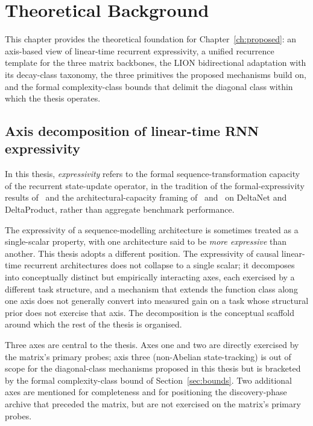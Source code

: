 \chapter{Theoretical Background}\label{ch:theoretical}

This chapter provides the theoretical foundation for
Chapter~\ref{ch:proposed}: an axis-based view of linear-time
recurrent expressivity, a unified recurrence template for the
three matrix backbones, the LION bidirectional adaptation with
its decay-class taxonomy, the three primitives the proposed
mechanisms build on, and the formal complexity-class bounds that
delimit the diagonal class within which the thesis operates.

\section{Axis decomposition of linear-time RNN expressivity}\label{sec:axes}

In this thesis, \textit{expressivity} refers to the formal
sequence-transformation capacity of the recurrent state-update
operator, in the tradition of the formal-expressivity results
of~\citet{sarrof2024expressive} and the architectural-capacity
framing of~\citet{yang2024deltanet} and~\citet{siems2025deltaproduct}
on DeltaNet and DeltaProduct, rather than aggregate benchmark
performance.

The expressivity of a sequence-modelling architecture is sometimes
treated as a single-scalar property, with one architecture said to
be \textit{more expressive} than another. This thesis adopts a
different position. The expressivity of causal linear-time
recurrent architectures does not collapse to a single scalar; it
decomposes into conceptually distinct but empirically interacting
axes, each exercised by a different task structure, and a
mechanism that extends the function class along one axis does not
generally convert into measured gain on a task whose structural
prior does not exercise that axis. The decomposition is the
conceptual scaffold around which the rest of the thesis is
organised.

Three axes are central to the thesis. Axes one and two are
directly exercised by the matrix's primary probes; axis three
(non-Abelian state-tracking) is out of scope for the
diagonal-class mechanisms proposed in this thesis but is
bracketed by the formal complexity-class bound of
Section~\ref{sec:bounds}. Two additional axes are mentioned for
completeness and for positioning the discovery-phase archive that
preceded the matrix, but are not exercised on the matrix's
primary probes.

